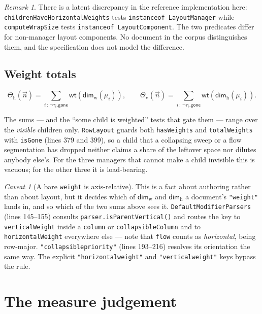 \documentclass[11pt,a4paper]{article}
\newcommand{\gone}{\mathsf{gone}}
\newcommand{\Dimw}{\mathsf{dim}_{\mathrm{w}}}
\newcommand{\Dimh}{\mathsf{dim}_{\mathrm{h}}}
\newcommand{\wt}{\mathsf{wt}}
\newcommand{\jv}[1]{\texttt{#1}}       %
\theoremstyle{definition}
\theoremstyle{plain}
\theoremstyle{remark}
\newtheorem*{remark}{Remark}
\newtheorem{warning}{Caveat}[section]
\begin{document}
\begin{remark}
There is a latent discrepancy in the reference implementation here:
\jv{childrenHaveHorizontalWeights} tests \jv{instanceof LayoutManager} while
\jv{computeWrapSize} tests \jv{instanceof LayoutComponent}. The two predicates
differ for non-manager layout components. No document in the corpus
distinguishes them, and the specification does not model the difference.
\end{remark}

\subsection{Weight totals}
\label{sec:weights}

\[
  \Theta_{\mathrm{h}}(\vec{n}) = \!\!\sum_{i \,:\, \neg \tau_i.\gone}\!\! \wt(\Dimw(\mu_i)),
  \qquad
  \Theta_{\mathrm{v}}(\vec{n}) = \!\!\sum_{i \,:\, \neg \tau_i.\gone}\!\! \wt(\Dimh(\mu_i)).
\]

The sums --- and the ``some child is weighted'' tests that gate them --- range
over the \emph{visible} children only. \jv{RowLayout} guards both
\jv{hasWeights} and \jv{totalWeights} with \jv{isGone} (lines 379 and 399), so a
child that a collapsing sweep or a flow segmentation has dropped neither claims
a share of the leftover space nor dilutes anybody else's. For the three
managers that cannot make a child invisible this is vacuous; for the other
three it is load-bearing.

\begin{warning}[A bare \texttt{weight} is axis-relative]
\label{sec:axisweight}
This is a fact about authoring rather than about layout, but it decides which of
$\Dimw$ and $\Dimh$ a document's \jv{"weight"} lands in, and so which of the two
sums above sees it. \jv{DefaultModifierParsers} (lines 145--155) consults
\jv{parser.isParentVertical()} and routes the key to \jv{verticalWeight} inside
a \jv{column} or \jv{collapsibleColumn} and to \jv{horizontalWeight} everywhere
else --- note that \jv{flow} counts as \emph{horizontal}, being row-major.
\jv{"collapsiblepriority"} (lines 193--216) resolves its orientation the same
way. The explicit \jv{"horizontalweight"} and \jv{"verticalweight"} keys bypass
the rule.
\end{warning}

\section{The measure judgement}
\label{sec:measure}
\end{document}
